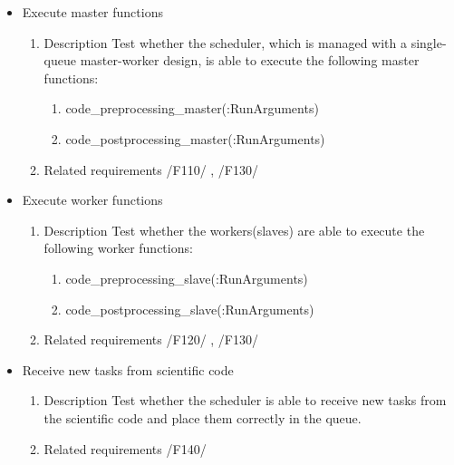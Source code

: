 {\begin{itemize}
				\item Execute master functions
				\begin{enumerate}
						\item Description\newline
Test whether the scheduler, which is managed with a single-queue master-worker design, is able to execute the following master functions: 
					\begin{enumerate}
\item code\_preprocessing\_master(:RunArguments)
						\item code\_postprocessing\_master(:RunArguments)
					\end{enumerate}
						\item Related requirements\newline
 							  /F110/	, /F130/	
				\end{enumerate}
				
				
				
				\item Execute worker functions
				\begin{enumerate}
						\item Description\newline
Test whether the workers(slaves) are able to execute the following worker functions: 
					\begin{enumerate}
						\item code\_preprocessing\_slave(:RunArguments)
						\item code\_postprocessing\_slave(:RunArguments)
					\end{enumerate}
						\item Related requirements\newline
 							  /F120/	, /F130/
				\end{enumerate}
				
				
				\item Receive new tasks from scientific code
				\begin{enumerate}
					\item Description\newline
Test whether the scheduler is able to receive new tasks from the scientific code and place them correctly in the queue.
					\item Related requirements\newline
						/F140/
				\end{enumerate}
				
				
				

\end{itemize}}
